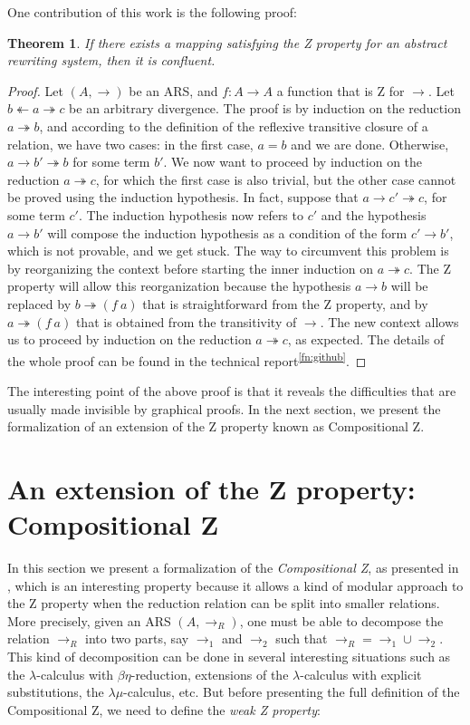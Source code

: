 \documentclass[a4paper]{article}
\newcommand{\tto}{\twoheadrightarrow}
\newcommand{\ott}{\twoheadleftarrow}
\newtheorem{theorem}{Theorem}[section]
\begin{document}
One contribution of this work is the following proof:
\begin{theorem}\cite{dehornoy2008z}
  If there exists a mapping satisfying the Z property for an abstract
  rewriting system, then it is confluent.
\end{theorem}
\begin{proof}
  Let $(A,\to)$ be an ARS, and $f: A \to A$ a function that is Z for
  $\to$. Let $b \ott a \tto c$ be an arbitrary divergence. The proof
  is by induction on the reduction $a \tto b$, and according to the
  definition of the reflexive transitive closure of a relation, we
  have two cases: in the first case, $a=b$ and we are done. Otherwise,
  $a \to b' \tto b$ for some term $b'$. We now want to proceed by
  induction on the reduction $a \tto c$, for which the first case is
  also trivial, but the other case cannot be proved using the
  induction hypothesis. In fact, suppose that $a \to c' \tto c$, for
  some term $c'$. The induction hypothesis now refers to $c'$ and the
  hypothesis $a \to b'$ will compose the induction hypothesis as a
  condition of the form $c' \to b'$, which is not provable, and we get
  stuck. The way to circumvent this problem is by reorganizing the
  context before starting the inner induction on $a \tto c$. The Z
  property will allow this reorganization because the hypothesis
  $a \to b$ will be replaced by $b \tto (f\ a)$ that is
  straightforward from the Z property, and by $a \tto (f\ a)$ that is
  obtained from the transitivity of $\to$. The new context allows us
  to proceed by induction on the reduction $a \tto c$, as expected. The details of the whole proof can be found in the technical report\textsuperscript{\ref{fn:github}}.
\end{proof}
  
The interesting point of the above proof is that it reveals the difficulties that are usually made invisible by graphical proofs. In the next section, we present the formalization of an extension of the Z property known as Compositional Z.

\section{An extension of the Z property: Compositional Z}

In this section we present a formalization of the
\textit{Compositional Z}, as presented in \cite{Nakazawa-Fujita2016},
which is an interesting property because it allows a kind of modular
approach to the Z property when the reduction relation can be split
into smaller relations. More precisely, given an ARS $(A,\to_R)$, one
must be able to decompose the relation $\to_R$ into two parts, say
$\to_1$ and $\to_2$ such that $\to_R = \to_1\cup \to_2$. This kind of
decomposition can be done in several interesting situations such as
the $\lambda$-calculus with $\beta\eta$-reduction\cite{Ba84},
extensions of the $\lambda$-calculus with explicit
substitutions\cite{accl91}, the $\lambda\mu$-calculus\cite{Parigot92},
etc. But before presenting the full definition of the Compositional Z,
we need to define the \textit{weak Z property}:
\end{document}
